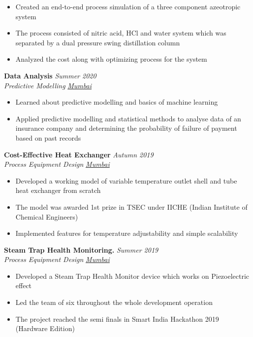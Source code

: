 \documentclass[10pt]{article}
\begin{document}
\begin{itemize}[itemsep = -0.75 mm, leftmargin=*]
    \item Created an end-to-end process simulation of a three component azeotropic system
    \item The process consisted of nitric acid, HCl and water system which was separated by a dual pressure swing distillation column
    \item Analyzed the cost along with optimizing process for the system
\end{itemize}
\textbf{\large Data Analysis} \hfill{\sl \small Summer 2020}\\
\textit{ Predictive Modelling }\hfill{\sl \small \href{https://www.mumbai.com}{Mumbai}}\\\vspace{-15pt}
\begin{itemize}[itemsep = -0.75 mm, leftmargin=*]
    \item Learned about predictive modelling and basics of machine learning
    \item Applied predictive modelling and statistical methods to analyse data of an insurance company and determining the probability of failure of payment based on past records
\end{itemize}
\textbf{\large Cost-Effective Heat Exchanger} \hfill{\sl \small Autumn 2019}\\
\textit{ Process Equipment Design }\hfill{\sl \small \href{https://www.mumbai.com}{Mumbai}}\\\vspace{-15pt}
\begin{itemize}[itemsep = -0.75 mm, leftmargin=*]
    \item Developed a working model of variable temperature outlet shell and tube heat exchanger from scratch
    \item The model was awarded 1st prize in TSEC under IICHE (Indian Institute of Chemical Engineers)
    \item Implemented features for temperature adjustability and simple scalability
\end{itemize}
\textbf{\large Steam Trap Health Monitoring.} \hfill{\sl \small Summer 2019}\\
\textit{ Process Equipment Design }\hfill{\sl \small \href{https://www.mumbai.com}{Mumbai}}\\\vspace{-15pt}
\begin{itemize}[itemsep = -0.75 mm, leftmargin=*]
    \item Developed a Steam Trap Health Monitor device which works on Piezoelectric effect
    \item Led the team of six throughout the whole development operation
    \item The project reached the semi finals in Smart India Hackathon 2019 (Hardware Edition)
\end{itemize}
\vspace*{-3pt}
\end{document}
